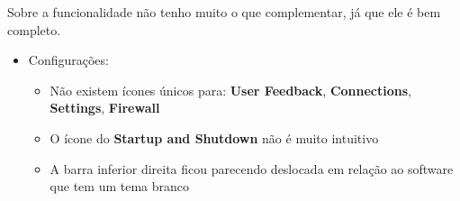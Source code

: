 \documentclass[10pt]{article}
\begin{document}
Sobre a funcionalidade não tenho muito o que complementar, já que ele é bem completo.

\begin{itemize}
    \item Configurações:
    \begin{itemize}
        \item Não existem ícones únicos para: \textbf{User Feedback}, \textbf{Connections}, \textbf{Settings}, \textbf{Firewall}
        \item O ícone do \textbf{Startup and Shutdown} não é muito intuitivo
        \item A barra inferior direita ficou parecendo deslocada em relação ao software que tem um tema branco
    \end{itemize}
\end{itemize}
\end{document}
